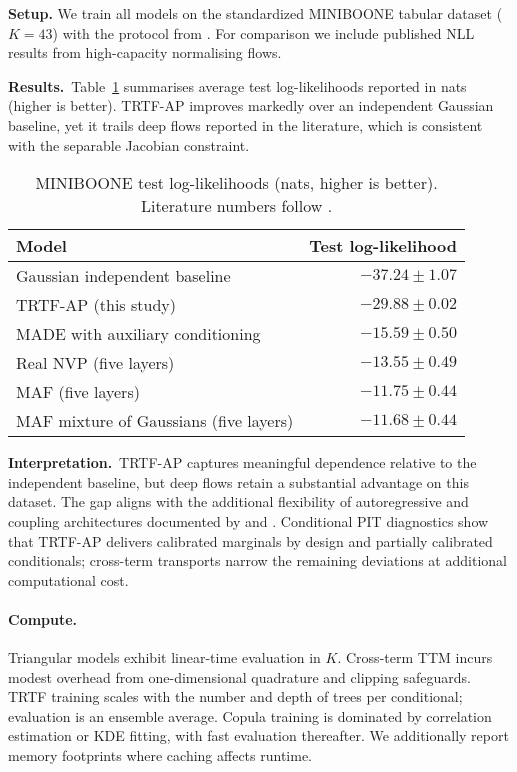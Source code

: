 \documentclass[11pt,a4paper,twoside]{book}\usepackage[]{graphicx}\usepackage[]{xcolor}
\begin{document}
\textbf{Setup.} We train all models on the standardized MINIBOONE tabular dataset ($K=43$) with the protocol from \citet{papamakarios2017masked}. For comparison we include published NLL results from high-capacity normalising flows.

\textbf{Results.}~Table~\ref{tab:miniboone-ll} summarises average test log-likelihoods reported in nats (higher is better). TRTF-AP improves markedly over an independent Gaussian baseline, yet it trails deep flows reported in the literature, which is consistent with the separable Jacobian constraint.
\begin{table}[htbp]
  \centering
  \caption{MINIBOONE test log-likelihoods (nats, higher is better). Literature numbers follow \citet{papamakarios2017masked}.}
  \label{tab:miniboone-ll}
  \begin{tabular}{lr}
    \hline
    Model & Test log-likelihood \\ 
    \hline
    Gaussian independent baseline & $-37.24 \pm 1.07$ \\ 
    TRTF-AP (this study) & $-29.88 \pm 0.02$ \\ 
    MADE with auxiliary conditioning & $-15.59 \pm 0.50$ \\ 
    Real NVP (five layers) & $-13.55 \pm 0.49$ \\ 
    MAF (five layers) & $-11.75 \pm 0.44$ \\ 
    MAF mixture of Gaussians (five layers) & $-11.68 \pm 0.44$ \\ 
    \hline
  \end{tabular}
\end{table}

\textbf{Interpretation.}~TRTF-AP captures meaningful dependence relative to the independent baseline, but deep flows retain a substantial advantage on this dataset. The gap aligns with the additional flexibility of autoregressive and coupling architectures documented by \citet{papamakarios2017masked} and \citet{dinh2017real}. Conditional PIT diagnostics show that TRTF-AP delivers calibrated marginals by design and partially calibrated conditionals; cross-term transports narrow the remaining deviations at additional computational cost.
\paragraph{Compute.} Triangular models exhibit linear-time evaluation in $K$. Cross-term TTM incurs modest overhead from one-dimensional quadrature and clipping safeguards. TRTF training scales with the number and depth of trees per conditional; evaluation is an ensemble average. Copula training is dominated by correlation estimation or KDE fitting, with fast evaluation thereafter. We additionally report memory footprints where caching affects runtime.
\end{document}
